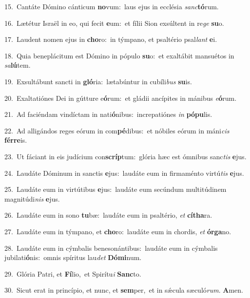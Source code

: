 {\numbfont\textcolor{\numbcolor}{15.}}~Cantáte Dómino cánticum \textbf{no}\-vum:~\star laus ejus in ecclésia \textit{sanc}\-\textbf{tó}rum.\par
{\numbfont\textcolor{\numbcolor}{16.}}~Lætétur Israël in eo, qui fecit \textbf{e}\-um:~\star et fílii Sion exsúltent in re\textit{ge} \textbf{su}\-o.\par
{\numbfont\textcolor{\numbcolor}{17.}}~Laudent nomen ejus in \textbf{cho}\-ro:~\star in týmpano, et psaltério psal\textit{lant} \textbf{e}\-i.\par
{\numbfont\textcolor{\numbcolor}{18.}}~Quia beneplácitum est Dómino in pópulo \textbf{su}\-o:~\star et exaltábit mansuétos in \textit{sa}\-\textbf{lú}tem.\par
{\numbfont\textcolor{\numbcolor}{19.}}~Exsultábunt sancti in \textbf{gló}\-ria:~\star lætabúntur in cubíli\textit{bus} \textbf{su}\-is.\par
{\numbfont\textcolor{\numbcolor}{20.}}~Exaltatiónes Dei in gútture e\-\textbf{ó}\-rum:~\star et gládii ancípites in mánibus \textit{e}\-\textbf{ó}rum.\par
{\numbfont\textcolor{\numbcolor}{21.}}~Ad faciéndam vindíctam in nati\-\textbf{ó}\-nibus:~\star increpatiónes \textit{in} \textbf{pó}\-\textbf{pu}lis.\par
{\numbfont\textcolor{\numbcolor}{22.}}~Ad alligándos reges eórum in com\-\textbf{pé}\-dibus:~\star et nóbiles eórum in máni\textit{cis} \textbf{fér}\-\textbf{re}is.\par
{\numbfont\textcolor{\numbcolor}{23.}}~Ut fáciant in eis judícium con\-\textbf{scríp}\-tum:~\star glória hæc est ómnibus sanc\textit{tis} \textbf{e}\-jus.\par
{\numbfont\textcolor{\numbcolor}{24.}}~Laudáte Dóminum in sanctis \textbf{e}\-jus:~\star laudáte eum in firmaménto virtú\textit{tis} \textbf{e}\-jus.\par
{\numbfont\textcolor{\numbcolor}{25.}}~Laudáte eum in virtútibus \textbf{e}\-jus:~\star laudáte eum secúndum multitúdinem magnitúdi\textit{nis} \textbf{e}\-jus.\par
{\numbfont\textcolor{\numbcolor}{26.}}~Laudáte eum in sono \textbf{tu}\-bæ:~\star laudáte eum in psaltério, \textit{et} \textbf{cí}\-\textbf{tha}ra.\par
{\numbfont\textcolor{\numbcolor}{27.}}~Laudáte eum in týmpano, et \textbf{cho}\-ro:~\star laudáte eum in chordis, \textit{et} \textbf{ór}\-\textbf{ga}no.\par
{\numbfont\textcolor{\numbcolor}{28.}}~Laudáte eum in cýmbalis benesonántibus:~\dagger laudáte eum in cýmbalis jubilati\-\textbf{ó}\-nis:~\star omnis spíritus lau\textit{det} \textbf{Dó}\-\textbf{mi}num.\par
{\numbfont\textcolor{\numbcolor}{29.}}~Glória Patri, et \textbf{Fí}\-lio,~\star et Spirítu\textit{i} \textbf{Sanc}\-to.\par
{\numbfont\textcolor{\numbcolor}{30.}}~Sicut erat in princípio, et nunc, et \textbf{sem}\-per,~\star et in sǽcula sæculó\-\textit{rum}\-. \textbf{A}\-men.\par
